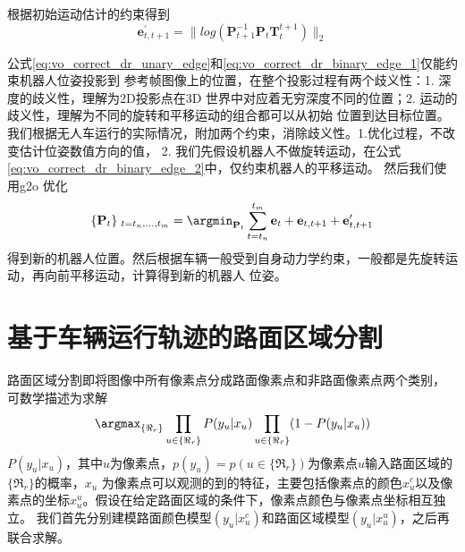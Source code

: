 根据初始运动估计的约束得到
\begin{equation}
    \label{eq:vo_correct_dr_binary_edge_2} 
    \mathbf{e}_{t,t+1}^{\prime} = \|log(\mathbf{P}_{t+1}^{-1}\mathbf{P}_{t}\mathbf{T}_{t}^{t+1})\|_2
\end{equation}

公式\ref{eq:vo_correct_dr_unary_edge}和\ref{eq:vo_correct_dr_binary_edge_1}仅能约束机器人位姿投影到
参考帧图像上的位置，在整个投影过程有两个歧义性：1. 深度的歧义性，理解为2D投影点在3D
世界中对应着无穷深度不同的位置；2. 运动的歧义性，理解为不同的旋转和平移运动的组合都可以从初始
位置到达目标位置。我们根据无人车运行的实际情况，附加两个约束，消除歧义性。1.优化过程，不改变估计位姿数值方向的值，
2. 我们先假设机器人不做旋转运动，在公式 \ref{eq:vo_correct_dr_binary_edge_2}中，仅约束机器人的平移运动。
然后我们使用g2o \cite{}优化
\begin{equation}
    \{\mathbf{P}_t\}\; _{t=t_n,...,t_m} = \argmin_{{\mathbf{P}}_t} \sum_{t=t_n}^{t_m} \mathbf{e}_t+\mathbf{e}_{t,t+1}+\mathbf{e}_{t,t+1}^{\prime}
    \label{eq:corr_loss}
\end{equation}
得到新的机器人位置。然后根据车辆一般受到自身动力学约束，一般都是先旋转运动，再向前平移运动\cite{}，计算得到新的机器人
位姿。

\section{基于车辆运行轨迹的路面区域分割}
路面区域分割即将图像中所有像素点分成路面像素点和非路面像素点两个类别，
可数学描述为求解
\begin{equation}
    \argmax_{\{\Re_r\}} \prod_{u\in \{\Re_r\}} P(y_u|x_u)\prod_{u\in \{\Re_{\bar{r}}\}}( 1-P(y_u|x_u))
\end{equation}
$P(y_u|x_u)$，其中$u$为像素点，$p(y_u)=p(u\in \{\Re_r\})$为像素点$u$输入路面区域的$\{\Re_r\}$的概率，$x_u$
为像素点可以观测的到的特征，主要包括像素点的颜色$x_u^c$以及像素点的坐标$x_u^u$。假设在给定路面区域的条件下，像素点颜色与像素点坐标相互独立。
我们首先分别建模路面颜色模型$(y_u|x_u^c)$和路面区域模型$(y_u|x_u^u)$，之后再联合求解。
